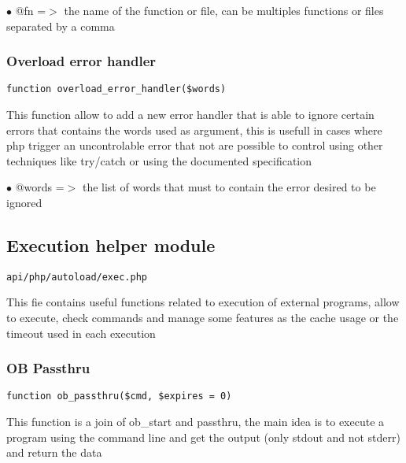 \documentclass[a4paper]{article}
\begin{document}
\begin{compactitem}
\item[\color{myblue}$\bullet$] @fn =$>$ the name of the function or file, can be multiples functions or files separated
       by a comma
\end{compactitem}

\hypertarget{toc121}{}
\subsubsection{Overload error handler}

\begin{lstlisting}
function overload_error_handler($words)
\end{lstlisting}

This function allow to add a new error handler that is able to ignore certain errors
that contains the words used as argument, this is usefull in cases where php trigger
an uncontrolable error that not are possible to control using other techniques like
try/catch or using the documented specification

\begin{compactitem}
\item[\color{myblue}$\bullet$] @words =$>$ the list of words that must to contain the error desired to be ignored
\end{compactitem}

\hypertarget{toc122}{}
\subsection{Execution helper module}

\begin{lstlisting}
api/php/autoload/exec.php
\end{lstlisting}

This fie contains useful functions related to execution of external programs, allow to execute,
check commands and manage some features as the cache usage or the timeout used in each execution

\hypertarget{toc123}{}
\subsubsection{OB Passthru}

\begin{lstlisting}
function ob_passthru($cmd, $expires = 0)
\end{lstlisting}

This function is a join of ob\_start and passthru, the main idea
is to execute a program using the command line and get the
output (only stdout and not stderr) and return the data
\end{document}
